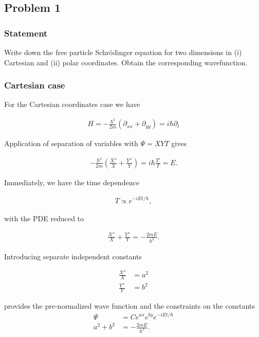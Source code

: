 \subsection{Problem 1}
\subsubsection{Statement}

Write down the free particle Schr\"{o}dinger equation for two dimensions in (i) Cartesian and (ii) polar coordinates.  Obtain the corresponding wavefunction.

\subsubsection{Cartesian case}

For the Cartesian coordinates case we have 

\begin{align}\label{eqn:desaiCh4:100}
H = -\frac{\hbar^2}{2m} (\partial_{xx} + \partial_{yy}) = i \hbar \partial_t
\end{align}

Application of separation of variables with $\Psi = XYT$ gives 

\begin{align}\label{eqn:desaiCh4:101}
-\frac{\hbar^2}{2m} \left( \frac{X''}{X} +\frac{Y''}{Y} \right) = i \hbar \frac{T'}{T} = E .
\end{align}

Immediately, we have the time dependence

\begin{align}\label{eqn:desaiCh4:102}
T \propto e^{-i E t/\hbar},
\end{align}

with the PDE reduced to 

\begin{align}\label{eqn:desaiCh4:103}
\frac{X''}{X} +\frac{Y''}{Y} = - \frac{2m E}{\hbar^2}.
\end{align}

Introducing separate independent constants 

\begin{align}\label{eqn:desaiCh4:104}
\frac{X''}{X} &= a^2 \\
\frac{Y''}{Y} &= b^2 
\end{align}

provides the pre-normalized wave function and the constraints on the constants
\begin{align}\label{eqn:desaiCh4:105}
\Psi &= C 
e^{ax}
e^{by}
e^{-iE t/\hbar} \\
a^2 + b^2 &= -\frac{2 m E}{\hbar^2}.
\end{align}

